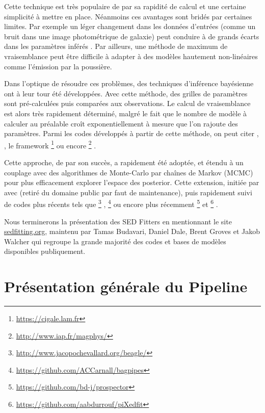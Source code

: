 \documentclass[../main/main.tex]{subfiles}
\begin{document}
Cette technique est très populaire de par sa rapidité de calcul et une
certaine simplicité à mettre en place. Néanmoins ces avantages sont
bridés par certaines limites. Par exemple un léger changement
dans les données d'entrées (comme un bruit dans une image photométrique
de galaxie) peut conduire à de grands écarts dans les paramètres
inférés \citep{Ocvirk}.
Par ailleurs, une méthode de maximum de vraisemblance peut être difficile à adapter
à des modèles hautement non-linéaires comme l'émission par la poussière.

Dans l'optique de résoudre ces problèmes, des techniques d'inférence
bayésienne ont à leur tour été développées. Avec cette méthode, des
grilles de paramètres sont pré-calculées puis comparées aux
observations. Le calcul de vraisemblance est alors très rapidement
déterminé, malgré le fait que le nombre de modèle à calculer au
préalable croît exponentiellement à mesure que l'on rajoute des
paramètres. Parmi les codes développés à partir de cette méthode, on peut citer \citet{Kauffman2003}, \citet{Salim2007}, le
framework \footnote{\url{https://cigale.lam.fr}}
\citep{Burgarella2005, Noll2009, Boquien2019} ou encore
\footnote{\url{http://www.iap.fr/magphys/}}
\citep{Cunha2008MAGPHYS}.

Cette approche, de par son succès, a rapidement été adoptée, et
étendu à un couplage avec des algorithmes de Monte-Carlo par chaînes de
Markov (MCMC) pour plus efficacement explorer l'espace des
posterior. Cette extension, initiée par \citet{Acquaviva2011} avec
 (retiré du domaine public par faut de maintenance), puis
rapidement suivi de codes plus récents tels que
\footnote{\url{http://www.jacopochevallard.org/beagle/}}
\citep{Chevallard2016},
\footnote{\url{https://github.com/ACCarnall/bagpipes}}
\citep{Carnall2018, Carnall2019} ou encore plus récemment
\footnote{\url{https://github.com/bd-j/prospector}}
\citep{JohnsonProspector} et
\footnote{\url{https://github.com/aabdurrouf/piXedfit}}
\citep{Abdurro'ufPixedfit}.

Nous terminerons la présentation des SED Fitters en mentionnant le site
\url{sedfitting.org}, maintenu par Tamas Budavari, Daniel Dale, Brent
Groves et Jakob Walcher qui regroupe la grande majorité des codes et bases
de modèles disponibles publiquement.

\section{Présentation générale du Pipeline}\label{sec:pipeline}
\end{document}
